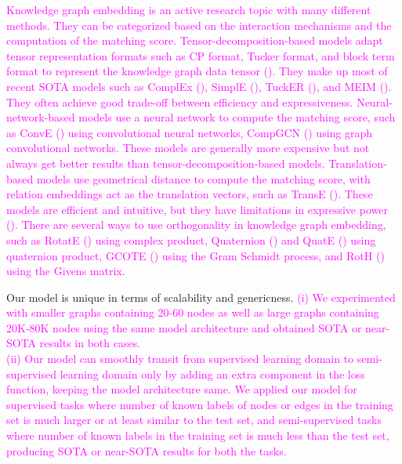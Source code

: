 \textcolor{magenta}{Knowledge graph embedding is an active research topic with many different methods. They can be categorized based on the interaction mechanisms and the computation of the matching score. Tensor-decomposition-based models adapt tensor representation formats such as CP format, Tucker format, and block term format to represent the knowledge graph data tensor (\citet{kolda2009tensor}). They make up most of recent SOTA models such as ComplEx (\citet{trouillon2016complex}), SimplE (\citet{kazemi2018simple}), TuckER (\citet{balavzevic2019tucker}), and MEIM (\citet{DBLP:conf/ijcai/TranT22}). They often achieve good trade-off between efficiency and expressiveness. Neural-network-based models use a neural network to compute the matching score, such as ConvE (\citet{dettmers2018convolutional}) using convolutional neural networks, CompGCN (\citet{vashishthcomposition}) using graph convolutional networks. These models are generally more expensive but not always get better results than tensor-decomposition-based models. Translation-based models use geometrical distance to compute the matching score, with relation embeddings act as the translation vectors, such as TransE (\citet{bordes2013translating}). These models are efficient and intuitive, but they have limitations in expressive power (\citet{kazemi2018simple}). There are several ways to use orthogonality in knowledge graph embedding, such as RotatE (\citet{sunrotate}) using complex product, Quaternion (\citet{tran2019analyzing}) and QuatE (\citet{zhang2019quaternion}) using quaternion product, GCOTE (\citet{tang2020orthogonal}) using the Gram Schmidt process, and RotH (\citet{chami2020low}) using the Givens matrix.}

Our model is unique in terms of scalability and genericness.
\textcolor{magenta}{
(i) We experimented with smaller graphs containing 20-60 nodes as well as large graphs containing 20K-80K nodes using the same model architecture and obtained SOTA or near-SOTA results in both cases.\\
(ii) Our model can smoothly transit from supervised learning domain to semi-supervised learning domain only by adding an extra component in the loss function, keeping the model architecture same. We applied our model for supervised tasks where number of known labels of nodes or edges in the training set is much larger or at least similar to the test set, and semi-supervised tasks where number of known labels in the training set is much less than the test set, producing SOTA or near-SOTA results for both the tasks.
}